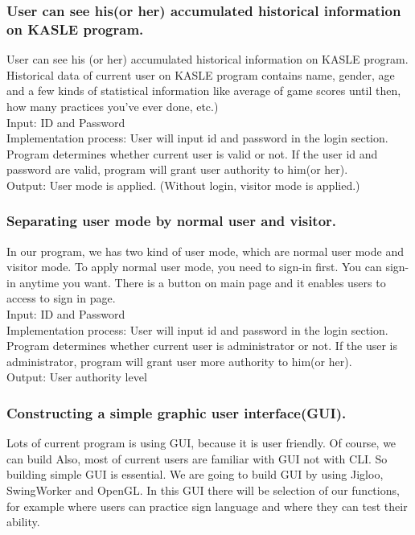 \documentclass[10pt,journal,compsoc]{IEEEtran}
\begin{document}
\subsubsection{User can see his(or her) accumulated historical information on KASLE program.\\}
User can see his (or her) accumulated historical information on KASLE program. Historical data of current user on KASLE program contains name, gender, age and a few kinds of statistical information like average of game scores until then, how many practices you’ve ever done, etc.)
\\Input: ID and Password
\\Implementation process: User will input id and password in the login section. Program determines whether current user is valid or not. If the user id and password are valid, program will grant user authority to him(or her).
\\Output: User mode is applied. (Without login, visitor mode is applied.)

\subsubsection{Separating user mode by normal user and visitor.\\}

In our program, we has two kind of user mode, which are normal user mode and visitor mode. To apply normal user mode, you need to sign-in first. You can sign-in anytime you want. There is a button on main page and it enables users to access to sign in page.
\\Input: ID and Password
\\Implementation process: User will input id and password in the login section. Program determines whether current user is administrator or not. If the user is administrator, program will grant user more authority to him(or her).
\\Output: User authority level

\subsubsection{Constructing a simple graphic user interface(GUI).\\}
Lots of current program is using GUI, because it is user friendly. Of course, we can build Also, most of current users are familiar with GUI not with CLI.  So building simple GUI is essential. We are going to build GUI by using Jigloo, SwingWorker and OpenGL. In this GUI there will be selection of our functions, for example where users can practice sign language and where they can test their ability.
\end{document}
